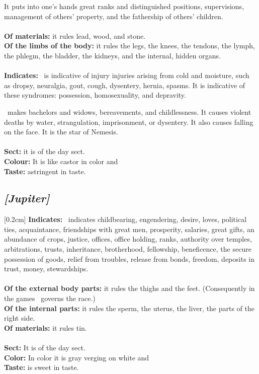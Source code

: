 It puts into one’s hands great ranks and distinguished positions, supervisions, management of others’ property, and the fathership of others’ children. \\
\\
\textbf{Of materials:} it rules lead, wood, and stone. \\
\textbf{Of the limbs of the body:} it rules the legs, the knees, the tendons, the lymph, the phlegm, the bladder, the kidneys, and the internal, hidden organs. \\
\\
\textbf{Indicates:} \Saturn\, is indicative of injury injuries arising from cold and moisture, such as dropsy, neuralgia, gout, cough, dysentery, hernia, spasms. It is indicative of these syndromes: possession, homosexuality, and depravity. 

\Saturn\, makes bachelors and widows, bereavements, and childlessness. It causes violent deaths by water, strangulation, imprisonment, or dysentery. It also causes falling on the face. It is the star of Nemesis. \\
\\
\textbf{Sect:} it is of the day sect.\\
\textbf{Colour:} It is like castor in color and \\
\textbf{Taste:} astringent in taste.

\secbr
\subsection{\textit{[Jupiter]}}
[0.2cm]
\noindent
{}
\textbf{Indicates:} \Jupiter\,  indicates childbearing, engendering, desire, loves, political ties, acquaintance, friendships with great men, prosperity, salaries, great gifts, an abundance of crops, justice, offices, office holding, ranks, authority over temples, arbitrations, trusts, inheritance, brotherhood, fellowship, beneficence, the secure possession of goods, relief from troubles, release from bonds, freedom, deposits in trust, money, stewardships. \\
\\
\textbf{Of the external body parts:} it rules the thighs and the feet. (Consequently in the games \Jupiter\, governs the race.)\\
\textbf{Of the internal parts:}  it rules the sperm, the uterus, the liver, the parts of the right side. \\
\textbf{Of materials:} it rules tin. \\
\\
\textbf{Sect:} It is of the day sect. \\
\textbf{Color:} In color it is 
gray verging on white and \\
\textbf{Taste:} is 
sweet in taste.

